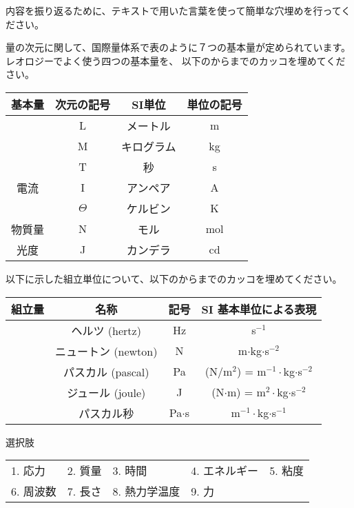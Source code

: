\documentclass[uplatex,dvipdfmx,a4paper,11pt]{jsarticle}
\begin{document}
\clearpage
{}
内容を振り返るために、テキストで用いた言葉を使って簡単な穴埋めを行ってください。
\begin{qlist}
  \qitem 量の次元に関して、国際量体系で表のように７つの基本量が定められています。レオロジーでよく使う四つの基本量を、
  以下のからまでのカッコを埋めてください。
	\begin{center}
		\begin{tabular}{|c|c||c|c|} \hline
			基本量 		& 次元の記号 & SI単位 		& 単位の記号\\ \hline \hline
			\qbox{}		& L			& メートル 		& m \\ \hline
			\qbox{}		& M			& キログラム 	& kg \\ \hline
			\qbox{}		& T			& 秒 			& s \\ \hline
			電流		& I			& アンペア 		& A \\ \hline
			\qbox{}	& $\Theta$	& ケルビン 		& K \\ \hline
			物質量		& N			& モル 			& mol \\ \hline
			光度		& J			& カンデラ 		& cd \\ \hline
		\end{tabular}
	\end{center}

	\qitem 以下に示した組立単位について、以下のからまでのカッコを埋めてください。
	\begin{center}
		\begin{tabular}{|c|c||c|c|} \hline
			組立量 		& 名称					& 記号		& SI 基本単位による表現 	\\ \hline \hline
			\qbox{}		& ヘルツ (hertz)		& Hz		&  s$^{-1}$ 					\\ \hline
			\qbox{}		& ニュートン (newton)	& N 		& m$\cdot$kg$\cdot$s$^{-2}$ 	\\ \hline
			\qbox{}		& パスカル (pascal)		& Pa 		& (N/m$^2$) = m$^{-1}\cdot$kg$\cdot$s$^{-2}$ \\ \hline
			\qbox{}	& ジュール (joule)		& J 		& (N$\cdot$m) = m$^{2}\cdot$kg$\cdot$s$^{-2}$ \\ \hline
			\qbox{}		& パスカル秒			& Pa$\cdot$s & m$^{-1}\cdot$kg$\cdot$s$^{-1}$ \\ \hline
		\end{tabular}
  \end{center}
  
  \begin{itembox}[l]{選択肢}
    \begin{center}
      \begin{tabular}{lllll}
        1. 応力&2. 質量&3. 時間&4. エネルギー&5. 粘度\\
        6. 周波数&7. 長さ&8. 熱力学温度&9. 力
      \end{tabular}
    \end{center}
  \end{itembox}
  

\end{qlist}
\end{document}
